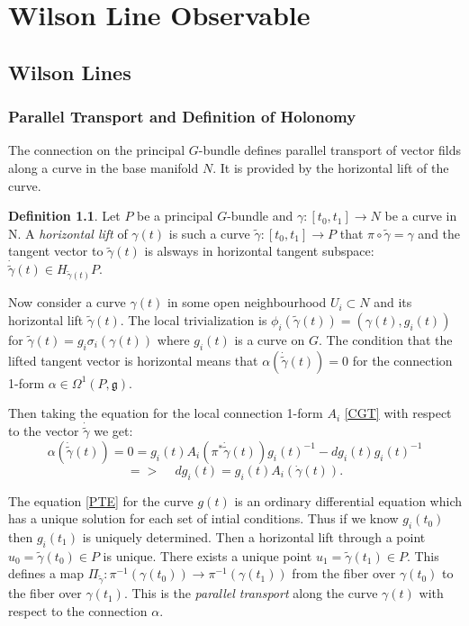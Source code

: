 \documentclass[11pt]{report}
\theoremstyle{plain}
\theoremstyle{definition}
\newtheorem{defn}[thm]{Definition}
\theoremstyle{remark}
\theoremstyle{remark}
\numberwithin{equation}{section}
\begin{document}
\chapter{Wilson Line Observable}

\section{Wilson Lines}

\subsection{Parallel Transport and Definition of Holonomy}

The connection on the principal $G$-bundle defines parallel transport of vector filds along a curve in the base manifold $N$. It is provided by the horizontal lift of the curve. 
\begin{defn}
Let $P$ be a principal $G$-bundle and $\gamma : [t_0,t_1] \to N$ be a curve in N. A \textit{horizontal lift} of $\gamma(t)$ is such a curve $\tilde{\gamma}: [t_0,t_1] \to P$ that $\pi \circ \tilde{\gamma} = \gamma$ and the tangent vector to $\tilde{\gamma}(t)$ is alsways in horizontal tangent subspace: $\dot{\tilde{\gamma}}(t) \in H_{\tilde{\gamma}(t)}P$.
\end{defn}


Now consider a curve $\gamma(t)$ in some open neighbourhood $U_i \subset N$ and its horizontal lift $\tilde{\gamma}(t)$. The local trivialization is $\phi_i(\tilde{\gamma}(t)) = (\gamma(t), g_i(t))$ for $\tilde{\gamma}(t) = g_i\sigma_i(\gamma(t))$ where $g_i(t)$ is a curve on $G$. The condition that the lifted tangent vector is horizontal means that $\alpha (\dot{\tilde{\gamma}}(t)) = 0$ for the connection 1-form $\alpha\in\Omega^1(P, \mathfrak{g})$. 

Then taking the equation for the local connection 1-form $A_i$ \eqref{CGT} with respect to the vector $\dot{\tilde{\gamma}}$ we get:
$$\alpha (\dot{\tilde{\gamma}}(t)) = 0 = g_i(t) A_i(\pi^*\dot{\tilde{\gamma}}(t))g_i(t)^{-1} - dg_i(t)g_i(t)^{-1}$$
\begin{equation}\label{PTE}
  =>  \, \, \,\, \,\, \, dg_i(t) = g_i(t) A_i(\dot{\gamma}(t)).
\end{equation}

The equation \eqref{PTE} for the curve $g(t)$ is an ordinary differential equation which has a unique solution for each set of intial conditions. Thus if we know $g_i(t_0)$ then $g_i(t_1)$ is uniquely determined. 
Then a horizontal lift through a point $u_0 = \tilde{\gamma}(t_0) \in P$ is unique. There exists a unique point $u_1 = \tilde{\gamma}(t_1) \in P$. This defines a map $\Pi_{\tilde{\gamma}} : \pi^{-1}(\gamma(t_0))  \to \pi^{-1}(\gamma(t_1))$ from the fiber over $\gamma(t_0)$ to the fiber over $\gamma(t_1)$. This is the \textit{parallel transport} along the curve $\gamma(t)$ with respect to the connection $\alpha$.
\end{document}
